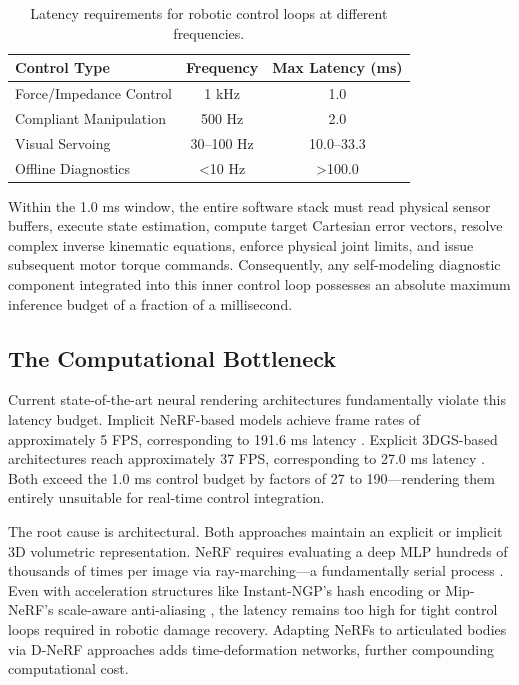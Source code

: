 \documentclass[12pt,a4paper,oneside]{report}
\begin{document}
\begin{table}[H]
\centering
\caption{Latency requirements for robotic control loops at different frequencies.}
\label{tab:control_loop_latency}
\begin{tabular}{lcc}
\toprule
\textbf{Control Type} & \textbf{Frequency} & \textbf{Max Latency (ms)} \\
\midrule
Force/Impedance Control & 1 kHz & 1.0 \\
Compliant Manipulation & 500 Hz & 2.0 \\
Visual Servoing & 30–100 Hz & 10.0–33.3 \\
Offline Diagnostics & <10 Hz & >100.0 \\
\bottomrule
\end{tabular}
\end{table}

Within the 1.0 ms window, the entire software stack must read physical sensor buffers, execute state estimation, compute target Cartesian error vectors, resolve complex inverse kinematic equations, enforce physical joint limits, and issue subsequent motor torque commands. Consequently, any self-modeling diagnostic component integrated into this inner control loop possesses an absolute maximum inference budget of a fraction of a millisecond.

\subsection{The Computational Bottleneck}

Current state-of-the-art neural rendering architectures fundamentally violate this latency budget. Implicit NeRF-based models achieve frame rates of approximately 5 FPS, corresponding to 191.6 ms latency \cite{hu2024teaching}. Explicit 3DGS-based architectures reach approximately 37 FPS, corresponding to 27.0 ms latency \cite{hu2025learning}. Both exceed the 1.0 ms control budget by factors of 27 to 190—rendering them entirely unsuitable for real-time control integration.

The root cause is architectural. Both approaches maintain an explicit or implicit 3D volumetric representation. NeRF requires evaluating a deep MLP hundreds of thousands of times per image via ray-marching—a fundamentally serial process \cite{mildenhall2020nerf}. Even with acceleration structures like Instant-NGP's hash encoding \cite{muller2022instant} or Mip-NeRF's scale-aware anti-aliasing \cite{barron2021mip}, the latency remains too high for tight control loops required in robotic damage recovery. Adapting NeRFs to articulated bodies via D-NeRF approaches \cite{pumarola2021d} adds time-deformation networks, further compounding computational cost.
\end{document}
